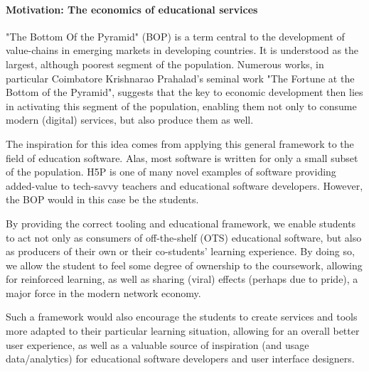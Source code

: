 \paragraph{Motivation: The economics of educational services}

"The Bottom Of the Pyramid" (BOP) is a term central to the development of
value-chains in emerging markets in developing countries. It is understood as
the largest, although poorest segment of the population. Numerous works, in
particular Coimbatore Krishnarao Prahalad's seminal work "The Fortune at the
Bottom of the Pyramid", suggests that the key to economic development then lies
in activating this segment of the population, enabling them not only to consume
modern (digital) services, but also produce them as 
well\cite{prahalad2009fortune}.

The inspiration for this idea comes from applying this general framework to the
field of education software. Alas, most software is written for only a small
subset of the population. H5P is one of many novel examples of software
providing added-value to tech-savvy teachers and educational software
developers. However, the BOP would in this case be the students.

By providing the correct tooling and educational framework, we enable students
to act not only as consumers of off-the-shelf (OTS) educational software, but
also as producers of their own or their co-students' learning experience. By
doing so, we allow the student to feel some degree of ownership to the
coursework, allowing for reinforced learning, as well as sharing (viral) effects
(perhaps due to pride), a major force in the modern network economy.

Such a framework would also encourage the students to create services and tools
more adapted to their particular learning situation, allowing for an overall
better user experience, as well as a valuable source of inspiration (and usage
data/analytics) for educational software developers and user interface
designers.
